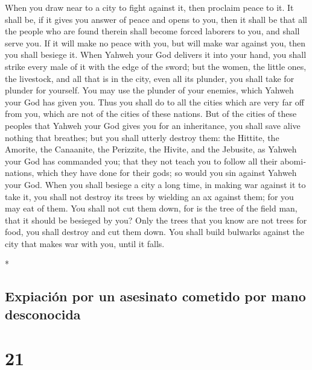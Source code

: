 \begin{paracol}{2}
\begin{otherlanguage}{english}
 When you draw near to a city to fight against it, then
proclaim peace to it.  It shall be, if it gives you
answer of peace and opens to you, then it shall be that all the people
who are found therein shall become forced laborers to you, and shall
serve you.  If it will make no peace with you, but will
make war against you, then you shall besiege it.  When
Yahweh your God delivers it into your hand, you shall strike every male
of it with the edge of the sword;  but the women, the
little ones, the livestock, and all that is in the city, even all its
plunder, you shall take for plunder for yourself. You may use the
plunder of your enemies, which Yahweh your God has given you.
 Thus you shall do to all the cities which are very far
off from you, which are not of the cities of these nations.
 But of the cities of these peoples that Yahweh your God
gives you for an inheritance, you shall save alive nothing that
breathes;  but you shall utterly destroy them: the
Hittite, the Amorite, the Canaanite, the Perizzite, the Hivite, and the
Jebusite, as Yahweh your God has commanded you;  that
they not teach you to follow all their abominations, which they have
done for their gods; so would you sin against Yahweh your God.
 When you shall besiege a city a long time, in making war
against it to take it, you shall not destroy its trees by wielding an ax
against them; for you may eat of them. You shall not cut them down, for
is the tree of the field man, that it should be besieged by you?
 Only the trees that you know are not trees for food, you
shall destroy and cut them down. You shall build bulwarks against the
city that makes war with you, until it falls.

\end{otherlanguage}

\switchcolumn[0]*

\hypertarget{expiaciuxf3n-por-un-asesinato-cometido-por-mano-desconocida}{%
\subsection{Expiación por un asesinato cometido por mano
desconocida}\label{expiaciuxf3n-por-un-asesinato-cometido-por-mano-desconocida}}

\hypertarget{section-40}{%
\section{21}\label{section-40}}


\end{paracol}
